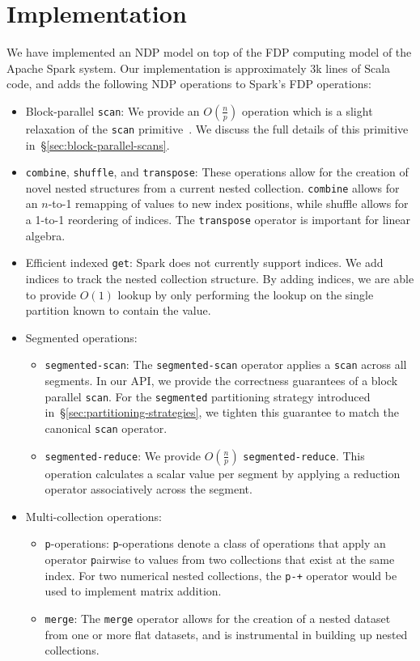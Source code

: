 \documentclass[preprint]{sigplanconf}
\theoremstyle{definition}
\begin{document}
\section{Implementation}
\label{sec:implementation}

We have implemented an NDP model on top of the FDP computing model of the Apache Spark system.
Our implementation is approximately 3k lines of Scala~\cite{odersky04} code, and adds the following
NDP operations to Spark's FDP operations:

\begin{itemize}
\item Block-parallel \texttt{scan}: We provide an $O(\frac{n}{p})$ operation which is a slight relaxation
of the \texttt{scan} primitive~\cite{blelloch93}. We discuss the full details of this primitive
in~\S\ref{sec:block-parallel-scans}.
\item \texttt{combine}, \texttt{shuffle}, and \texttt{transpose}: These operations allow for the creation of
novel nested structures from a current nested collection. \texttt{combine} allows for an $n$-to-1
remapping of values to new index positions, while shuffle allows for a 1-to-1 reordering of indices. The
\texttt{transpose} operator is important for linear algebra.
\item Efficient indexed \texttt{get}: Spark does not currently support indices. We add indices to track the
nested collection structure. By adding indices, we are able to provide $O(1)$ lookup by only performing
the lookup on the single partition known to contain the value.
\item Segmented operations:
\begin{itemize}
\item \texttt{segmented-scan}: The \texttt{segmented-scan} operator applies a \texttt{scan} across all
segments. In our API, we provide the correctness guarantees of a block parallel \texttt{scan}. For the
\texttt{segmented} partitioning strategy introduced in~\S\ref{sec:partitioning-strategies}, we tighten this
guarantee to match the canonical \texttt{scan} operator.
\item \texttt{segmented-reduce}: We provide $O(\frac{n}{p})$ \texttt{segmented-\linebreak reduce}. This
operation calculates a scalar value per segment by applying a reduction operator associatively across
the segment.
\end{itemize}
\item Multi-collection operations:
\begin{itemize}
\item \texttt{p}-operations: \texttt{p}-operations denote a class of operations that apply an operator
\texttt{p}airwise to values from two collections that exist at the same index. For two numerical nested
collections, the \texttt{p-+} operator would be used to implement matrix addition.
\item \texttt{merge}: The \texttt{merge} operator allows for the creation of a nested dataset from one or
more flat datasets, and is instrumental in building up nested collections.
\end{itemize}
\end{itemize}
\end{document}
